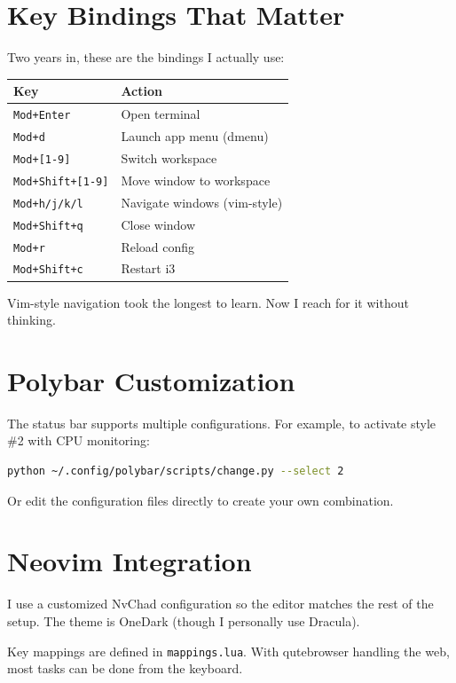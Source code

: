 \section{Key Bindings That Matter}

Two years in, these are the bindings I actually use:

\begin{center}
\begin{tabular}{ll}
\toprule
Key & Action \\
\midrule
\verb|Mod+Enter| & Open terminal \\
\verb|Mod+d| & Launch app menu (dmenu) \\
\verb|Mod+[1-9]| & Switch workspace \\
\verb|Mod+Shift+[1-9]| & Move window to workspace \\
\verb|Mod+h/j/k/l| & Navigate windows (vim-style) \\
\verb|Mod+Shift+q| & Close window \\
\verb|Mod+r| & Reload config \\
\verb|Mod+Shift+c| & Restart i3 \\
\bottomrule
\end{tabular}
\end{center}

Vim-style navigation took the longest to learn. Now I reach for it without thinking.

\section{Polybar Customization}

The status bar supports multiple configurations. For example, to activate style \#2 with CPU monitoring:

\begin{lstlisting}[language=bash]
python ~/.config/polybar/scripts/change.py --select 2
\end{lstlisting}

Or edit the configuration files directly to create your own combination.

\section{Neovim Integration}

I use a customized NvChad configuration so the editor matches the rest of the setup. The theme is OneDark (though I personally use Dracula).

Key mappings are defined in \verb|mappings.lua|. With qutebrowser handling the web, most tasks can be done from the keyboard.

